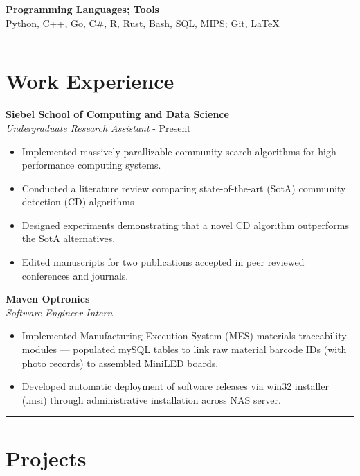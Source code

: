 \documentclass[11pt]{article}
\newcommand{\daterange}[4]{\formatdate{1}{#1}{#2} - \formatdate{1}{#3}{#4}}
\newcommand{\daterangepres}[2]{\formatdate{1}{#1}{#2} - Present}
\begin{document}
\textbf{Programming Languages; Tools} \\
Python, C++, Go, C\#, R, Rust, Bash, SQL, MIPS; Git, \LaTeX \\

\vspace*{-5mm}
\rule{\textwidth}{0.1pt}
\vspace*{-10mm}

\section*{Work Experience}
\vspace*{-2.5mm}

\textbf{Siebel School of Computing and Data Science} \\
\emph{Undergraduate Research Assistant} \hfill \daterangepres{5}{2025}
\begin{itemize}
    \cramped
    \item Implemented massively parallizable community search algorithms for high performance computing systems.
    \item Conducted a literature review comparing state-of-the-art (SotA) community detection (CD) algorithms
    \item Designed experiments demonstrating that a novel CD algorithm outperforms the SotA alternatives.
    \item Edited manuscripts for two publications accepted in peer reviewed conferences and journals.
\end{itemize}

\textbf{Maven Optronics} \hfill \daterange{5}{2024}{8}{2024} \\
\emph{Software Engineer Intern}
\begin{itemize}
    \cramped
    \item Implemented Manufacturing Execution System (MES) materials traceability modules — populated mySQL tables to link raw material barcode IDs (with photo records) to assembled MiniLED boards.
    \item Developed automatic deployment of software releases via win32 installer (.msi) through administrative installation across NAS server.
\end{itemize}

\rule{\textwidth}{0.1pt}
\vspace*{-10mm}

\section*{Projects}
\vspace*{-2.5mm}
\end{document}
